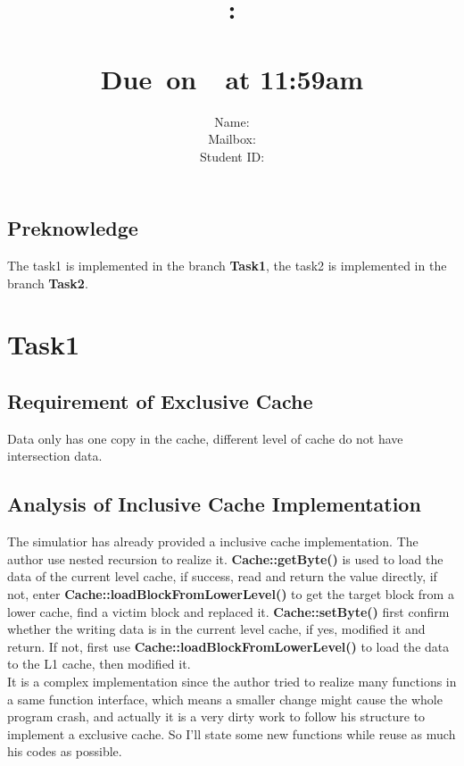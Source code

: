 \documentclass{article}
\title{
    \vspace{2in}
    \textmd{\textbf{\hmwkClass:\\  \hmwkTitle}}\\
    \normalsize\vspace{0.1in}\small{Due\ on\ \hmwkDueDate\ at 11:59am}\\
   \vspace{2in}
}
\author{
	Name: \textbf{\hmwkAuthorName} \\
    Mailbox: \textbf{\hmwkAuthorMail} \\
	Student ID: \hmwkAuthorID}
\date{}
\begin{document}
\maketitle
\pagebreak
\tableofcontents

\pagebreak


\subsection{Preknowledge}
The task1 is implemented in the branch \textbf{Task1}, the task2 is implemented in the branch \textbf{Task2}.
\section{Task1}
\subsection{Requirement of Exclusive Cache}
Data only has one copy in the cache, different level of cache do not have intersection data.
\subsection{Analysis of Inclusive Cache Implementation}
The simulatior has already provided a inclusive cache implementation. The author use nested recursion to realize it. \textbf{Cache::getByte()} is used to load the data of the current level cache, if success, read and return the value directly, if not, enter \textbf{Cache::loadBlockFromLowerLevel()} to get the target block from a lower cache, find a victim block and replaced it. \textbf{Cache::setByte()} first confirm whether the writing data is in the current level cache, if yes, modified it and return. If not, first use \textbf{Cache::loadBlockFromLowerLevel()} to load the data to the L1 cache, then modified it.\\
It is a complex implementation since the author tried to realize many functions in a same function interface, which means a smaller change might cause the whole program crash, and actually it is a very dirty work to follow his structure to implement a exclusive cache. So I'll state some new functions while reuse as much his codes as possible.
\end{document}

